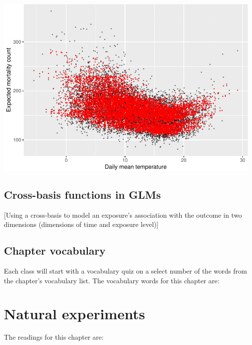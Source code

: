 \documentclass[
]{book}
\begin{document}
\includegraphics{adv_epi_analysis_files/figure-latex/unnamed-chunk-61-1.pdf}

\hypertarget{cross-basis-functions-in-glms}{%
\section{Cross-basis functions in GLMs}\label{cross-basis-functions-in-glms}}

{[}Using a cross-basis to model an exposure's association with the
outcome in two dimensions (dimensions of time and exposure level){]}

\hypertarget{chapter-vocabulary}{%
\section{Chapter vocabulary}\label{chapter-vocabulary}}

Each class will start with a vocabulary quiz on a select number of the words
from the chapter's vocabulary list. The vocabulary words for this chapter are:

\hypertarget{natural-experiments}{%
\chapter{Natural experiments}\label{natural-experiments}}

The readings for this chapter are:
\end{document}
